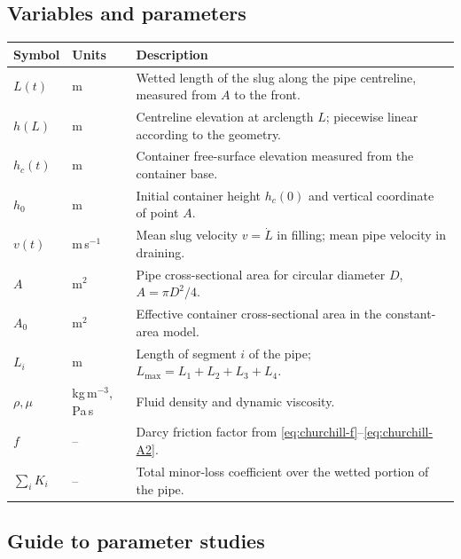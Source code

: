 \documentclass[11pt]{article}
\begin{document}
\subsection*{Variables and parameters}
\renewcommand{\arraystretch}{1.3}
\small
\begin{tabular}{lp{}p{}}
  Symbol & Units & Description \\ \hline
  $L(t)$ & m & Wetted length of the slug along the pipe centreline, measured from $A$ to the front. \\[0.2em]
  $h(L)$ & m & Centreline elevation at arclength $L$; piecewise linear according to the geometry. \\[0.2em]
  $h_c(t)$ & m & Container free-surface elevation measured from the container base. \\[0.2em]
  $h_0$ & m & Initial container height $h_c(0)$ and vertical coordinate of point $A$. \\[0.2em]
  $v(t)$ & m\,s$^{-1}$ & Mean slug velocity $v=\dot L$ in filling; mean pipe velocity in draining. \\[0.2em]
  $A$ & m$^2$ & Pipe cross-sectional area for circular diameter $D$, $A=\pi D^2/4$. \\[0.2em]
  $A_0$ & m$^2$ & Effective container cross-sectional area in the constant-area model. \\[0.2em]
  $L_i$ & m & Length of segment $i$ of the pipe; $L_{\max}=L_1+L_2+L_3+L_4$. \\[0.2em]
  $\rho,\mu$ & kg\,m$^{-3}$, Pa\,s & Fluid density and dynamic viscosity. \\[0.2em]
  $f$ & -- & Darcy friction factor from \eqref{eq:churchill-f}--\eqref{eq:churchill-A2}. \\[0.2em]
  $\sum_i K_i$ & -- & Total minor-loss coefficient over the wetted portion of the pipe. \\
\end{tabular}
\normalsize

\subsection{Guide to parameter studies}
\end{document}
